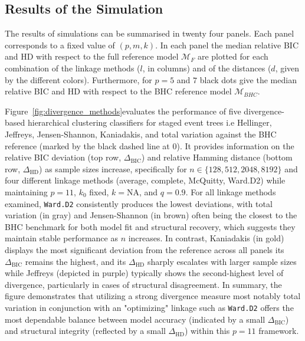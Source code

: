 \documentclass[preprint,12pt]{elsarticle}
\begin{document}
\subsection{Results of the Simulation} \label{ref:resultsSimulation}


The results of simulations can be summarised in twenty four panels. Each panel corresponds to a fixed value of 
$(p,m,k)$.  
In each panel the median relative BIC and HD with respect to the full reference model $\mathcal M_{F}$ are plotted for each combination of the linkage methods ($l$, in columns) and of the distances ($d$, given by the different colors). Furthermore, for $p=5$ and $7$ black dots give the 
median relative BIC and HD with respect to the BHC reference model $\mathcal M_{BHC}$. 







 Figure~\ref{fig:divergence_methods}evaluates the performance of five divergence-based hierarchical clustering classifiers for staged event trees i.e Hellinger, Jeffreys, Jensen-Shannon, Kaniadakis, and total variation against the BHC reference (marked by the black dashed line at $0$). It provides information on the relative BIC deviation (top row, $\Delta_{\mathrm{BIC}}$) and relative Hamming distance (bottom row, $\Delta_{\mathrm{HD}}$) as sample sizes increase, specifically for $n\in\{128,512,2048,8192\}$ and four different linkage methods (average, complete, McQuitty, Ward.D2) while maintaining $p=11$, $k_0$ fixed, $k=\mathrm{NA}$, and $q=0.9$. For all linkage methods examined, \texttt{Ward.D2} consistently produces the lowest deviations, with {total variation} (in gray) and Jensen-Shannon (in brown) often being the closest to the BHC benchmark for both model fit and structural recovery, which suggests they maintain stable performance as $n$ increases. In contrast, Kaniadakis (in gold) displays the most significant deviation from the reference across all panels its $\Delta_{\mathrm{BIC}}$ remains the highest, and its $\Delta_{\mathrm{HD}}$ sharply escalates with larger sample sizes while Jeffreys (depicted in purple) typically shows the second-highest level of divergence, particularly in cases of structural disagreement. In summary, the figure demonstrates that utilizing a strong divergence measure most notably total variation in conjunction with an "optimizing" linkage such as \texttt{Ward.D2} offers the most dependable balance between model accuracy (indicated by a small $\Delta_{\mathrm{BIC}}$) and structural integrity (reflected by a small $\Delta_{\mathrm{HD}}$) within this $p=11$ framework.
\end{document}
